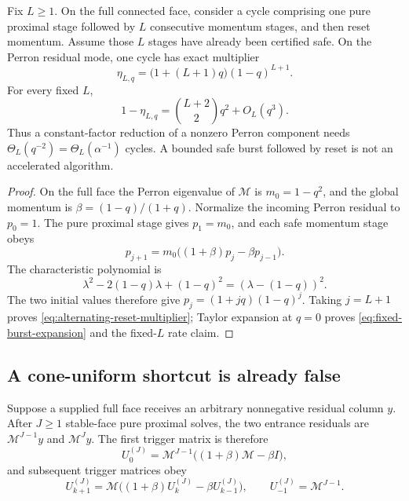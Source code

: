 \documentclass[11pt]{article}
\begin{document}
\begin{proposition}
\label{prop:alternating-reset-slow}
Fix \(L\geq1\).  On the full connected face, consider a cycle comprising one
pure proximal stage followed by \(L\) consecutive momentum stages, and then
reset momentum.  Assume those \(L\) stages have already been certified safe.
On the Perron residual mode, one cycle has exact multiplier
\begin{equation}
 \eta_{L,q}=\bigl(1+(L+1)q\bigr)(1-q)^{L+1}.
\label{eq:alternating-reset-multiplier}
\end{equation}
For every fixed \(L\),
\begin{equation}
 1-\eta_{L,q}=\binom{L+2}{2}q^2+O_L(q^3).
 \label{eq:fixed-burst-expansion}
\end{equation}
Thus a constant-factor reduction of a nonzero Perron component needs
\(\Theta_L(q^{-2})=\Theta_L(\alpha^{-1})\) cycles.  A bounded safe burst
followed by reset is not an accelerated algorithm.
\end{proposition}

\begin{proof}
On the full face the Perron eigenvalue of \(\mathcal M\) is
\(m_0=1-q^2\), and the global momentum is
\(\beta=(1-q)/(1+q)\).  Normalize the incoming Perron residual to
\(p_0=1\).  The pure proximal stage gives \(p_1=m_0\), and each safe
momentum stage obeys
\[
 p_{j+1}=m_0\bigl((1+\beta)p_j-\beta p_{j-1}\bigr).
\]
The characteristic polynomial is
\[
 \lambda^2-2(1-q)\lambda+(1-q)^2=(\lambda-(1-q))^2.
\]
The two initial values therefore give
\(p_j=(1+jq)(1-q)^j\).  Taking \(j=L+1\) proves
\eqref{eq:alternating-reset-multiplier}; Taylor expansion at \(q=0\)
proves \eqref{eq:fixed-burst-expansion} and the fixed-\(L\) rate claim.
\end{proof}

\subsection{A cone-uniform shortcut is already false}
\label{sec:cone-screen}

Suppose a supplied full face receives an arbitrary nonnegative residual
column \(y\).  After \(J\geq1\) stable-face pure proximal solves, the two
entrance residuals are \(\mathcal M^{J-1}y\) and
\(\mathcal M^Jy\).  The first trigger matrix is therefore
\begin{equation}
 U_0^{(J)}=
 \mathcal M^{J-1}\bigl((1+\beta)\mathcal M-\beta I\bigr),
 \label{eq:path-lock-trigger-kernel-initial}
\end{equation}
and subsequent trigger matrices obey
\begin{equation}
 U_{k+1}^{(J)}=
 \mathcal M\bigl((1+\beta)U_k^{(J)}-\beta U_{k-1}^{(J)}\bigr),
 \qquad U_{-1}^{(J)}=\mathcal M^{J-1}.
 \label{eq:path-lock-trigger-kernel-recurrence}
\end{equation}
\end{document}
